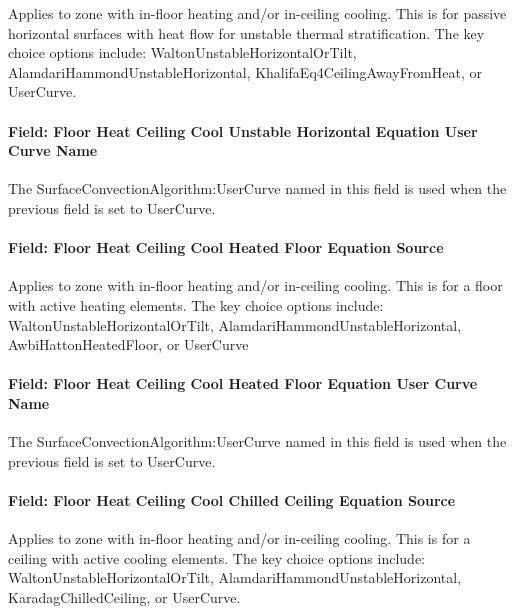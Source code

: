 Applies to zone with in-floor heating and/or in-ceiling cooling. This is for passive horizontal surfaces with heat flow for unstable thermal stratification. The key choice options include: WaltonUnstableHorizontalOrTilt, AlamdariHammondUnstableHorizontal, KhalifaEq4CeilingAwayFromHeat, or UserCurve.

\paragraph{Field: Floor Heat Ceiling Cool Unstable Horizontal Equation User Curve Name}\label{field-floor-heat-ceiling-cool-unstable-horizontal-equation-user-curve-name}

The SurfaceConvectionAlgorithm:UserCurve named in this field is used when the previous field is set to UserCurve.

\paragraph{Field: Floor Heat Ceiling Cool Heated Floor Equation Source}\label{field-floor-heat-ceiling-cool-heated-floor-equation-source}

Applies to zone with in-floor heating and/or in-ceiling cooling. This is for a floor with active heating elements. The key choice options include: WaltonUnstableHorizontalOrTilt, AlamdariHammondUnstableHorizontal, AwbiHattonHeatedFloor, or UserCurve

\paragraph{Field: Floor Heat Ceiling Cool Heated Floor Equation User Curve Name}\label{field-floor-heat-ceiling-cool-heated-floor-equation-user-curve-name}

The SurfaceConvectionAlgorithm:UserCurve named in this field is used when the previous field is set to UserCurve.

\paragraph{Field: Floor Heat Ceiling Cool Chilled Ceiling Equation Source}\label{field-floor-heat-ceiling-cool-chilled-ceiling-equation-source}

Applies to zone with in-floor heating and/or in-ceiling cooling. This is for a ceiling with active cooling elements. The key choice options include: WaltonUnstableHorizontalOrTilt, AlamdariHammondUnstableHorizontal, KaradagChilledCeiling, or UserCurve.

